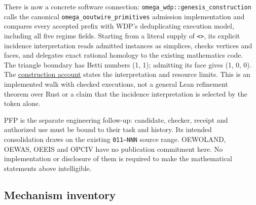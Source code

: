 \documentclass[
  11pt,
]{article}
\begin{document}
There is now a concrete software connection:
\texttt{omega\_wdp::genesis\_construction} calls the canonical
\nolinkurl{omega_ooutwire_primitives} admission implementation and
compares every accepted prefix with WDP's deduplicating execution model,
including all five regime fields. Starting from a literal supply of
\texttt{\textless{}\textgreater{}}, its explicit incidence
interpretation reads admitted instances as simplices, checks vertices
and faces, and delegates exact rational homology to the existing
mathematics code. The triangle boundary has Betti numbers (1, 1);
admitting its face gives (1, 0, 0). The
\href{docs/sources/incidence_construction.txt}{construction account}
states the interpretation and resource limits. This is an implemented
walk with checked executions, not a general Lean refinement theorem over
Rust or a claim that the incidence interpretation is selected by the
token alone.

PFP is the separate engineering follow-up: candidate, checker, receipt
and authorized use must be bound to their task and history. Its intended
consolidation draws on the existing \texttt{011–NNN} source range.
OEWOLAND, OEWAS, OEEIS and OPCIV have no publication commitment here. No
implementation or disclosure of them is required to make the
mathematical statements above intelligible.

\Needspace{480pt}
\subsection{Mechanism inventory}\label{mechanism-inventory}
\end{document}
